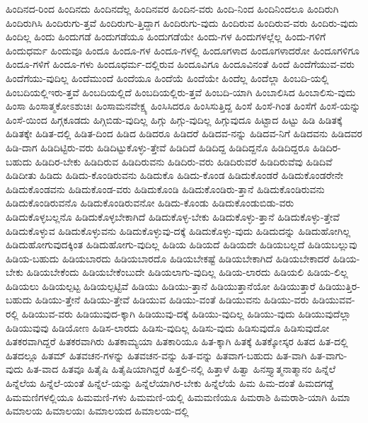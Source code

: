 {ಹಿಂದಿನದ-ರಿಂದ
ಹಿಂದಿನದು
ಹಿಂದಿನದೆಲ್ಲ
ಹಿಂದಿನವರ
ಹಿಂದಿನ-ವರು
ಹಿಂದಿ-ನಿಂದ
ಹಿಂದಿನಿಂದಲೂ
ಹಿಂದಿರುಗಿ
ಹಿಂದಿರುಗಿಸಿ
ಹಿಂದಿರುಗು-ತ್ತವೆ
ಹಿಂದಿರುಗು-ತ್ತಿದ್ದಾಗ
ಹಿಂದಿರುಗು-ವುದು
ಹಿಂದಿರುವ
ಹಿಂದಿರುವ-ವರು
ಹಿಂದಿರು-ವುದು
ಹಿಂದಿಲ್ಲ
ಹಿಂದು
ಹಿಂದುಗಡೆ
ಹಿಂದುಗಡೆಯೂ
ಹಿಂದುಗಡೆಯೇ
ಹಿಂದು-ಗಳ
ಹಿಂದುಗಳಲ್ಲೆಲ್ಲ
ಹಿಂದು-ಗಳಿಗೆ
ಹಿಂದುಧರ್ಮ
ಹಿಂದುವೂ
ಹಿಂದೂ
ಹಿಂದೂ-ಗಳ
ಹಿಂದೂ-ಗಳಲ್ಲಿ
ಹಿಂದೂಗಳಾದ
ಹಿಂದೂಗಳಾದರೋ
ಹಿಂದೂಗಳಿಗೂ
ಹಿಂದೂ-ಗಳಿಗೆ
ಹಿಂದೂ-ಗಳು
ಹಿಂದೂಧರ್ಮ-ದಲ್ಲಿರುವ
ಹಿಂದೂವಿಗೂ
ಹಿಂದೂವಿನಂತೆ
ಹಿಂದೆ
ಹಿಂದೆಗೆಯುವ-ವರು
ಹಿಂದೆಗೆಯು-ವುದಿಲ್ಲ
ಹಿಂದೆಮುಂದೆ
ಹಿಂದೆಯೂ
ಹಿಂದೆಯೆ
ಹಿಂದೆಯೇ
ಹಿಂದೆಲ್ಲ
ಹಿಂದೆಲ್ಲಾ
ಹಿಂಬದಿ-ಯಲ್ಲಿ
ಹಿಂಬದಿಯಲ್ಲಿಇರು-ತ್ತವೆ
ಹಿಂಬದಿಯಲ್ಲಿದೆ
ಹಿಂಬದಿಯಲ್ಲಿರು-ತ್ತವೆ
ಹಿಂಬದಿ-ಯಾಗಿ
ಹಿಂಬಾಲಿಸಿದ
ಹಿಂಬಾಲಿಸು-ವುದು
ಹಿಂಸಾ
ಹಿಂಸಾತ್ಮಕೋಽಶುಚಿಃ
ಹಿಂಸಾಮನವೇಕ್ಷ್ಯ
ಹಿಂಸಿಸಿದರೂ
ಹಿಂಸಿಸುತ್ತಿದ್ದ
ಹಿಂಸೆ
ಹಿಂಸೆ-ಗಿಂತ
ಹಿಂಸೆಗೆ
ಹಿಂಸೆ-ಯನ್ನು
ಹಿಂಸೆ-ಯಿಂದ
ಹಿಗ್ಗಕೂಡದು
ಹಿಗ್ಗಿಬಿಡು-ವುದಿಲ್ಲ
ಹಿಗ್ಗು
ಹಿಗ್ಗು-ವುದಿಲ್ಲ
ಹಿಗ್ಗುವುದೂ
ಹಿಟ್ಟಾದ
ಹಿಟ್ಟು
ಹಿಡಿ
ಹಿಡಿತಕ್ಕೆ
ಹಿಡಿತಕ್ಕೇ
ಹಿಡಿತ-ದಲ್ಲಿ
ಹಿಡಿತ-ದಿಂದ
ಹಿಡಿದ
ಹಿಡಿದರೂ
ಹಿಡಿದರೆ
ಹಿಡಿದವ-ನನ್ನು
ಹಿಡಿದವ-ನಿಗೆ
ಹಿಡಿದವನು
ಹಿಡಿದವರ
ಹಿಡಿ-ದಾಗ
ಹಿಡಿದಿಟ್ಟಿರು-ವರು
ಹಿಡಿದಿಟ್ಟುಕೊಳ್ಳು-ತ್ತೇವೆ
ಹಿಡಿದಿದೆ
ಹಿಡಿದಿದ್ದ
ಹಿಡಿದಿದ್ದನೊ
ಹಿಡಿದಿದ್ದರೂ
ಹಿಡಿದಿರ-ಬಹುದು
ಹಿಡಿದಿರ-ಬೇಕು
ಹಿಡಿದಿರುವ
ಹಿಡಿದಿರುವನು
ಹಿಡಿದಿರು-ವರು
ಹಿಡಿದಿರುವರೆ
ಹಿಡಿದಿರುವೆವು
ಹಿಡಿದಿವೆ
ಹಿಡಿದೀತು
ಹಿಡಿದು
ಹಿಡಿದು-ಕೊಂಡಿರುವನು
ಹಿಡಿದುಕೊ
ಹಿಡಿದು-ಕೊಂಡ
ಹಿಡಿದುಕೊಂಡರೆ
ಹಿಡಿದುಕೊಂಡರೇನೇ
ಹಿಡಿದುಕೊಂಡವನು
ಹಿಡಿದುಕೊಂಡ-ವರು
ಹಿಡಿದುಕೊಂಡಿ
ಹಿಡಿದುಕೊಂಡಿರು-ತ್ತಾನೆ
ಹಿಡಿದುಕೊಂಡಿರುವನು
ಹಿಡಿದುಕೊಂಡಿರುವನೊ
ಹಿಡಿದುಕೊಂಡಿರುವನೋ
ಹಿಡಿದು-ಕೊಂಡು
ಹಿಡಿದುಕೊಂಡುಬಿಡು-ವರು
ಹಿಡಿದುಕೊಳ್ಳಬಲ್ಲನೊ
ಹಿಡಿದುಕೊಳ್ಳಬೇಕಾಗಿದೆ
ಹಿಡಿದುಕೊಳ್ಳ-ಬೇಕು
ಹಿಡಿದುಕೊಳ್ಳು-ತ್ತಾನೆ
ಹಿಡಿದುಕೊಳ್ಳು-ತ್ತೇವೆ
ಹಿಡಿದುಕೊಳ್ಳುವ
ಹಿಡಿದುಕೊಳ್ಳುವನು
ಹಿಡಿದುಕೊಳ್ಳುವು-ದಕ್ಕೆ
ಹಿಡಿದುಕೊಳ್ಳು-ವುದು
ಹಿಡಿದುದನ್ನು
ಹಿಡಿದುಹೋಗಿಲ್ಲ
ಹಿಡಿದುಹೋಗುವುದಕ್ಕಿಂತ
ಹಿಡಿದುಹೋಗು-ವುದಿಲ್ಲ
ಹಿಡಿಯ
ಹಿಡಿಯದೆ
ಹಿಡಿಯದೇ
ಹಿಡಿಯಬಲ್ಲದೆ
ಹಿಡಿಯಬಲ್ಲುವು
ಹಿಡಿಯ-ಬಹುದು
ಹಿಡಿಯಬಾರದು
ಹಿಡಿಯಬಾರದೊ
ಹಿಡಿಯಬೇಕಷ್ಟೆ
ಹಿಡಿಯಬೇಕಾಗಿದೆ
ಹಿಡಿಯಬೇಕಾದರೆ
ಹಿಡಿಯ-ಬೇಕು
ಹಿಡಿಯಬೇಕೆಂದು
ಹಿಡಿಯಬೇಕೆಂಬುದೇ
ಹಿಡಿಯಲಾಗು-ವುದಿಲ್ಲ
ಹಿಡಿಯ-ಲಾರದು
ಹಿಡಿಯಲಿ
ಹಿಡಿಯ-ಲಿಲ್ಲ
ಹಿಡಿಯಲು
ಹಿಡಿಯಲ್ಪಟ್ಟ
ಹಿಡಿಯಲ್ಪಟ್ಟಿವೆ
ಹಿಡಿಯು
ಹಿಡಿಯು-ತ್ತಾನೆ
ಹಿಡಿಯುತ್ತಾನೆಯೋ
ಹಿಡಿಯುತ್ತಾರೆ
ಹಿಡಿಯುತ್ತಿರ-ಬಹುದು
ಹಿಡಿಯು-ತ್ತೇನೆ
ಹಿಡಿಯು-ತ್ತೇವೆ
ಹಿಡಿಯುವ
ಹಿಡಿಯು-ವಂತೆ
ಹಿಡಿಯುವನು
ಹಿಡಿಯು-ವರು
ಹಿಡಿಯುವವ-ರಲ್ಲಿ
ಹಿಡಿಯುವ-ವರು
ಹಿಡಿಯುವುದ-ಕ್ಕಾಗಿ
ಹಿಡಿಯುವು-ದಕ್ಕೆ
ಹಿಡಿಯು-ವುದಿಲ್ಲ
ಹಿಡಿಯು-ವುದು
ಹಿಡಿಯುವುದೆಲ್ಲಾ
ಹಿಡಿಯುವುವು
ಹಿಡಿಯೋಣ
ಹಿಡಿಸ-ಲಾರದು
ಹಿಡಿಸು-ವುದಿಲ್ಲ
ಹಿಡಿಸು-ವುದು
ಹಿಡಿಸುವುದೊ
ಹಿಡಿಸುವುದೋ
ಹಿತಕರವಾಗಿದ್ದರೆ
ಹಿತಕರವಾಗಿರು
ಹಿತಕಾಮ್ಯಯಾ
ಹಿತಕಾರಿಯೂ
ಹಿತ-ಕ್ಕಾಗಿ
ಹಿತಕ್ಕೆ
ಹಿತಕ್ಕೋಸ್ಕರ
ಹಿತದ
ಹಿತ-ದಲ್ಲಿ
ಹಿತದಲ್ಲೂ
ಹಿತಮ್
ಹಿತವಚನ-ಗಳನ್ನು
ಹಿತವಚನ-ವನ್ನು
ಹಿತ-ವನ್ನು
ಹಿತವಾಗ-ಬಹುದು
ಹಿತ-ವಾಗಿ
ಹಿತ-ವಾಗು-ವುದು
ಹಿತ-ವಾದ
ಹಿತವೂ
ಹಿತೈಷಿ
ಹಿತೈಷಿಯಾಗಿದ್ದರೆ
ಹಿತ್ತಲಿ-ನಲ್ಲಿ
ಹಿತ್ತಾಳೆ
ಹಿತ್ವಾ
ಹಿನಸ್ತ್ಯಾತ್ಮನಾತ್ಮಾನಂ
ಹಿನ್ನೆಲೆ
ಹಿನ್ನೆಲೆಯ
ಹಿನ್ನೆಲೆ-ಯಂತೆ
ಹಿನ್ನೆಲೆ-ಯನ್ನು
ಹಿನ್ನೆಲೆಯಾಗಿರ-ಬೇಕು
ಹಿನ್ನೆಲೆಯೆ
ಹಿಮ
ಹಿಮ-ದಂತೆ
ಹಿಮದಗಡ್ಡೆ
ಹಿಮಮಣಿಗಳಲ್ಲಿಯೂ
ಹಿಮಮಣಿ-ಗಳು
ಹಿಮಮಣಿ-ಯಲ್ಲಿ
ಹಿಮಮಣಿಯೂ
ಹಿಮರಾಶಿ
ಹಿಮರಾಶಿ-ಯಾಗಿ
ಹಿಮಾ
ಹಿಮಾಲಯ
ಹಿಮಾಲಯಃ
ಹಿಮಾಲಯದ
ಹಿಮಾಲಯ-ದಲ್ಲಿ
}
